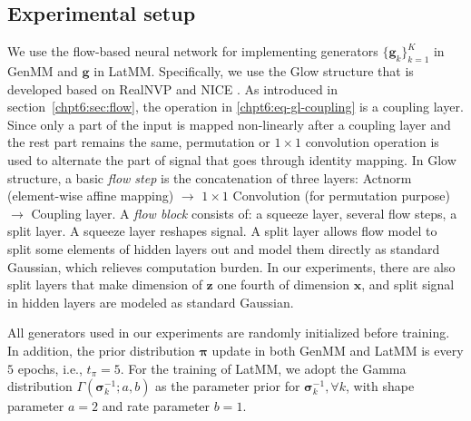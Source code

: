 \subsection{Experimental setup}\label{sub:exp-setup}

We use the flow-based neural network for implementing generators $\{\bm{g}_k\}_{k=1}^{K}$ in GenMM and $\bm{g}$ in LatMM. Specifically, we use the Glow structure \cite{2018arXiv180703039K} that is developed based on RealNVP \cite{2016arXiv160508803D} and NICE \cite{DBLP:journals/corr/DinhKB14}. As introduced in section~\ref{chpt6:sec:flow}, the operation in \eqref{chpt6:eq-gl-coupling} is a coupling
layer. Since only a part of the input is mapped non-linearly after a coupling
layer and the rest part remains the same, permutation \cite{2016arXiv160508803D} or $1\times 1$ convolution operation \cite{2018arXiv180703039K} is used to alternate the part of signal that goes through identity mapping. In Glow structure, a basic \textit{flow step} is the concatenation of three layers: Actnorm (element-wise affine mapping)
$\rightarrow$ $1\times 1$ Convolution (for permutation purpose)
$\rightarrow$ Coupling layer. A \textit{flow block} consists of: a squeeze layer,
several flow steps, a split layer. A squeeze layer reshapes
signal. A split layer allows
flow model to split some elements of hidden layers out and model them
directly as standard Gaussian, which relieves computation burden. In our experiments, there are also split layers that make dimension of $\bm{z}$ one fourth of dimension $\bm{x}$, and split signal in hidden layers are modeled as standard Gaussian. 

All generators used in our experiments are randomly initialized before training. 
In addition, the prior distribution $\bm{\pi}$ update in both GenMM and LatMM is every $5$ epochs, {i.e.},  $t_{\pi} = 5$. For the training of LatMM, we adopt the Gamma distribution $\Gamma(\bm{\sigma}_k^{-1}; a, b)$ as the parameter prior for $\bm{\sigma}_k^{-1}, \forall k$, with shape parameter $a=2$ and rate parameter $b = 1$.

